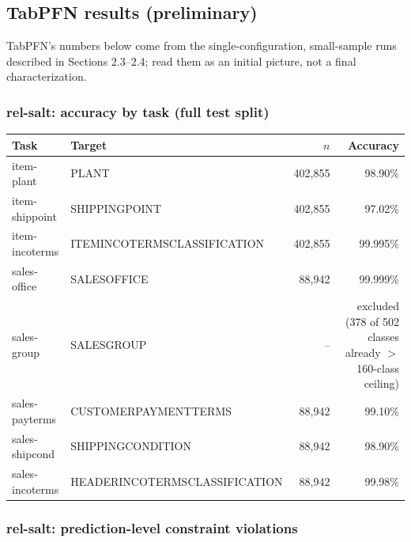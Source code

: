 \documentclass[11pt]{article}
\begin{document}
\subsection{TabPFN results (preliminary)}
\label{sec:tabpfn-results}

TabPFN's numbers below come from the single-configuration, small-sample runs described in
Sections 2.3--2.4; read them as an initial picture, not a final characterization.

\subsubsection{rel-salt: accuracy by task (full test split)}

\begin{table}[h]
\centering
\small
\begin{tabular}{@{} l l r r @{}}
\toprule
\textbf{Task} & \textbf{Target} & \textbf{$n$} & \textbf{Accuracy} \\
\midrule
item-plant & PLANT & 402{,}855 & 98.90\% \\
item-shippoint & SHIPPINGPOINT & 402{,}855 & 97.02\% \\
item-incoterms & ITEMINCOTERMSCLASSIFICATION & 402{,}855 & 99.995\% \\
sales-office & SALESOFFICE & 88{,}942 & 99.999\% \\
sales-group & SALESGROUP & -- & excluded (378 of 502 classes already $>$ 160-class ceiling) \\
sales-payterms & CUSTOMERPAYMENTTERMS & 88{,}942 & 99.10\% \\
sales-shipcond & SHIPPINGCONDITION & 88{,}942 & 98.90\% \\
sales-incoterms & HEADERINCOTERMSCLASSIFICATION & 88{,}942 & 99.98\% \\
\bottomrule
\end{tabular}
\end{table}

\subsubsection{rel-salt: prediction-level constraint violations}
\end{document}
